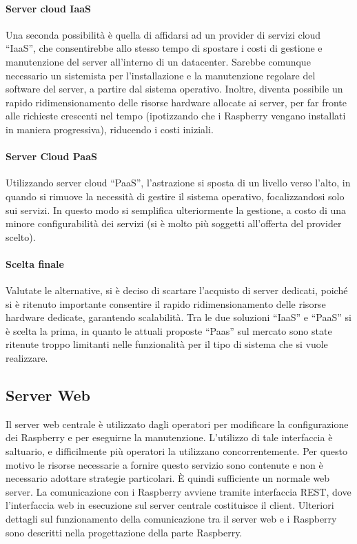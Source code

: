 \paragraph{Server cloud IaaS}
Una seconda possibilità è quella di affidarsi ad un provider di servizi cloud ``IaaS'', che consentirebbe allo stesso tempo di spostare i costi di gestione e manutenzione del server all'interno di un datacenter.
Sarebbe comunque necessario un sistemista per l'installazione e la manutenzione regolare del software del server, a partire dal sistema operativo.
Inoltre, diventa possibile un rapido ridimensionamento delle risorse hardware allocate ai server, per far fronte alle richieste crescenti nel tempo (ipotizzando che i Raspberry vengano installati in maniera progressiva), riducendo i costi iniziali.
\paragraph{Server Cloud PaaS}
Utilizzando server cloud ``PaaS'', l'astrazione si sposta di un livello verso l'alto, in quando si rimuove la necessità di gestire il sistema operativo, focalizzandosi solo sui servizi.
In questo modo si semplifica ulteriormente la gestione, a costo di una minore configurabilità dei servizi (si è molto più soggetti all'offerta del provider scelto).
\paragraph{Scelta finale}
Valutate le alternative, si è deciso di scartare l'acquisto di server dedicati, poiché si è ritenuto importante consentire il rapido ridimensionamento delle risorse hardware dedicate, garantendo scalabilità.
Tra le due soluzioni ``IaaS'' e ``PaaS'' si è scelta la prima, in quanto le attuali proposte ``Paas'' sul mercato sono state ritenute troppo limitanti nelle funzionalità per il tipo di sistema che si vuole realizzare.

\subsection{Server Web}
Il server web centrale è utilizzato dagli operatori per modificare la configurazione dei Raspberry e per eseguirne la manutenzione.
L'utilizzo di tale interfaccia è saltuario, e difficilmente più operatori la utilizzano concorrentemente.
Per questo motivo le risorse necessarie a fornire questo servizio sono contenute e non è necessario adottare strategie particolari.
È quindi sufficiente un normale web server.
La comunicazione con i Raspberry avviene tramite interfaccia REST, dove l'interfaccia web in esecuzione sul server centrale costituisce il client.
Ulteriori dettagli sul funzionamento della comunicazione tra il server web e i Raspberry sono descritti nella progettazione della parte Raspberry.

